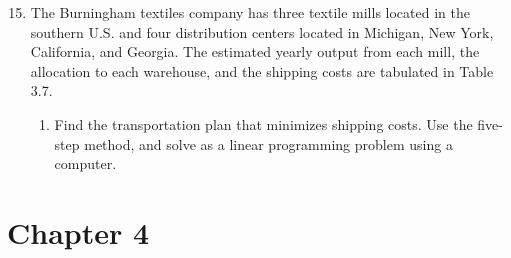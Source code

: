 \documentclass[12pt, oneside]{book}
\newenvironment{solution}{\textit{Solution.}}
\newcommand{\sol}[1]{
    \begin{customframedproof}[linecolor=orangehdx!75,]
        \begin{solution}
        #1
        \end{solution}
    \end{customframedproof}
}
\begin{document}
\begin{enumerate}

    \setcounter{enumi}{14}
    \item  The Burningham textiles company has three textile mills located in the southern U.S. and four distribution centers located in Michigan, New York, California, and Georgia. The estimated yearly output from each mill, the allocation to each warehouse, and the shipping costs are tabulated in Table 3.7.
    \begin{enumerate}
        \item Find the transportation plan that minimizes shipping costs. Use the five-step method, and solve as a linear programming problem using a computer.
    \end{enumerate}
\end{enumerate}


\section*{Chapter 4}
\end{document}
